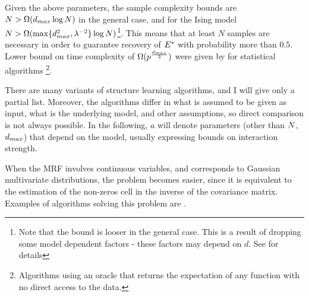Given the above parameters, the sample complexity bounds   are $N > \Omega(d_{max} \log N)$ in the general case, and for the Ising model $N > \Omega(\max\{d_{max}^2, \lambda^{-2}\}\log N)$\footnote{Note that the bound is looser in the general case. This is a result of dropping some model dependent factors - these factors may depend on $d$. See \cite{bresler2008reconstruction} for details}.
This means that at least $N$ samples are necessary in order to guarantee recovery of ${E}^{*}$ with probability more than $0.5$.
Lower bound on time complexity of $\Omega(p^{\frac{d_{max}}{2}})$ were given by \cite{bresler2014structure} for statistical algorithms \cite{feldman2013statistical}\footnote{Algorithms using an oracle that returns the expectation of any function with no direct access to the data.}.

There are many variants of structure learning algorithms, and I will give only a partial list. Moreover, the algorithms differ in what is assumed to be given as input, what is the underlying model, and other assumptions, so direct comparison is not always possible. In the following, $a$ will denote parameters (other than $N$, $d_{max}$) that depend on the model, usually expressing bounds on interaction strength.

When the MRF involves continuous variables, and corresponds to Gaussian multivariate distributions, the problem becomes easier, since it is equivalent to the estimation of the non-zeros cell in the inverse of the covariance matrix. Examples of algorithms solving this problem are \cite{meinshausen2006high, yuan2007model, friedman2008sparse}. 

